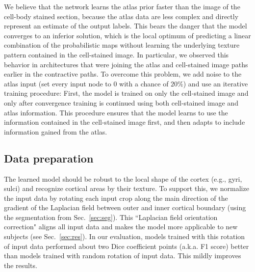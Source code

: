 \documentclass{article}
\newcommand\todo[1]{\textcolor{red}{#1}}
\begin{document}
We believe that the network learns the atlas prior faster than the image of the cell-body stained section, because the atlas data are less complex and directly represent an estimate of the output labels.
This bears the danger that the model converges to an inferior solution, which is the local optimum of predicting a linear combination of the probabilistic maps without learning the underlying texture pattern contained in the cell-stained image.
In particular, we observed this behavior in architectures that were joining the atlas and cell-stained image paths earlier in the contractive paths. %
To overcome this problem, we add noise to the atlas input (set every input node to $0$ with a chance of $20\%$) and use an iterative training procedure:
First, the model is trained on only the cell-stained image and only after convergence training is continued using both cell-stained image and atlas information.
This procedure ensures that the model learns to use the information contained in the cell-stained image first, and then adapts to include information gained from the atlas.

\vspace*{-.5\baselineskip}
\subsection{Data preparation}
\label{sec:arch:train}
\vspace*{-.5\baselineskip}

The learned model should be robust to the local shape of the cortex (e.g., gyri, sulci) and recognize cortical areas by their texture.
To support this, we normalize the input data by rotating each input crop along the main direction of the gradient of the Laplacian field between outer and inner cortical boundary (using the segmentation from Sec.~\ref{sec:seg}).
This ``Laplacian field orientation correction" aligns all input data and makes the model more applicable to new subjects (see Sec.~\ref{sec:res}). In our evaluation, models trained with this rotation of input data performed about two Dice coefficient points (a.k.a. F1 score) better than models trained with random rotation of input data. This mildly improves the results.
\end{document}
